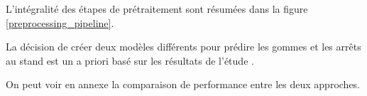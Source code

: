 L'intégralité des étapes de prétraitement sont résumées dans la figure \ref{preprocessing_pipeline}.


La décision de créer deux modèles différents pour prédire les gommes et les arrêts au stand est un a priori basé sur les résultats de l'étude \cite{app10217805}.

On peut voir en annexe la comparaison de performance entre les deux approches.
